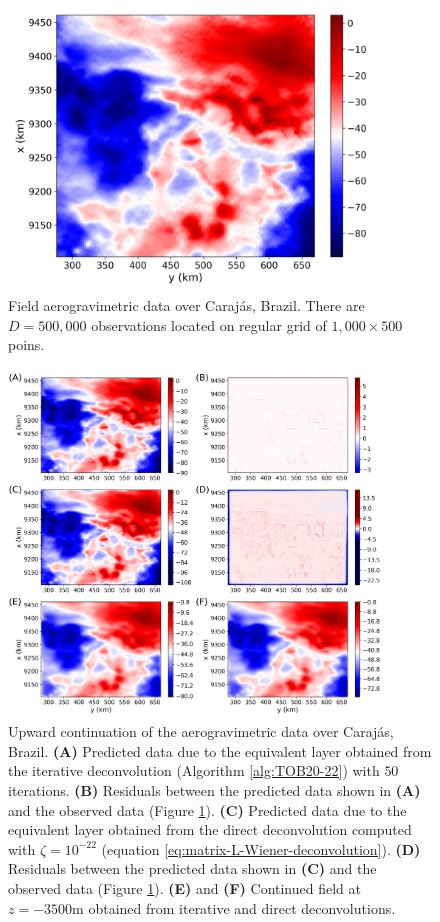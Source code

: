 \begin{figure}[htbp]
	\begin{center}
		\includegraphics[width=10cm]{Fig/carajas_gz_real_data_1000x500}
	\end{center}
	\caption{
		Field aerogravimetric data over Caraj{\'a}s, Brazil. 
		There are $D = 500, 000$ observations located on regular grid of $1,000 \times 500$ poins.
		}
	\label{fig:9}
\end{figure}

\begin{figure}[htbp]
	\begin{center}
		\includegraphics[width=10cm]{Fig/carajas_gz_predito_1000x500}
	\end{center}
	\caption{
		Upward continuation of the aerogravimetric data over Caraj{\'a}s, Brazil.
		\textbf{(A)} Predicted data due to the equivalent layer obtained from the iterative deconvolution 
		(Algorithm \ref{alg:TOB20-22}) with $50$ iterations.
		\textbf{(B)} Residuals between the predicted data shown in \textbf{(A)} and the observed data (Figure \ref{fig:9}). 
		\textbf{(C)} Predicted data due to the equivalent layer obtained from the direct deconvolution computed with $\zeta = 10^{-22}$
		(equation \ref{eq:matrix-L-Wiener-deconvolution}). 
		\textbf{(D)} Residuals between the predicted data shown in \textbf{(C)} and the observed data (Figure \ref{fig:9}). 
		\textbf{(E)} and \textbf{(F)} Continued field at $z = -3500 \mathrm{m}$ obtained from iterative and direct deconvolutions.
		}
	\label{fig:10}
\end{figure}

